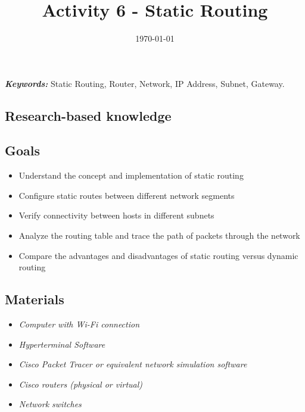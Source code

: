 \documentclass[twoside]{article}
\begin{document}

\title{Activity 6 - Static Routing}
\author{}
\date{\today}
\maketitle

\begin{justify}
    \textbf{\textit{Keywords:}} Static Routing, Router, Network, IP Address, Subnet, Gateway.
\end{justify}

\begin{multicols}{2}
\section{Research-based knowledge}
\subsection*{Goals}
\begin{itemize}
    \item Understand the concept and implementation of static routing
    \item Configure static routes between different network segments
    \item Verify connectivity between hosts in different subnets
    \item Analyze the routing table and trace the path of packets through the network
    \item Compare the advantages and disadvantages of static routing versus dynamic routing
\end{itemize}

\subsection*{Materials}
\begin{itemize}
    \item \textit{Computer with Wi-Fi connection}
    \item \textit{Hyperterminal Software}
    \item \textit{Cisco Packet Tracer or equivalent network simulation software}
    \item \textit{Cisco routers (physical or virtual)}
    \item \textit{Network switches}
\end{itemize}


\end{multicols}
\end{document}
